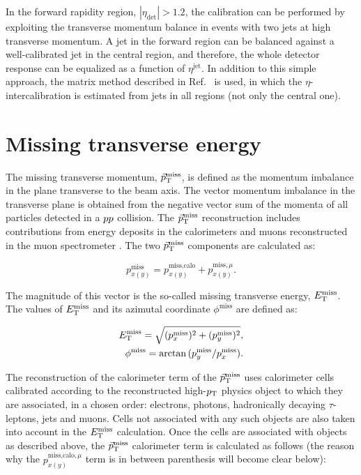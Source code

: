 In the forward rapidity region, $|\eta_\text{det}|>1.2$, the calibration can be performed by exploiting the transverse momentum balance in events with two jets at high transverse momentum. 
A jet in the forward region can be balanced against a well-calibrated jet in the central region, and therefore, the whole detector response can be equalized as a function of $\eta^{\text{jet}}$.
In addition to this simple approach, the matrix method described in Ref.~\cite{ATLAS:2011jea} is used, in which the $\eta$-intercalibration is estimated from jets in all regions (not only the central one).


\section{Missing transverse energy}
    \label{subsec:ETmissReco}

The missing transverse momentum, $\vec{p}_{\mathrm{T}}^{\mathrm{miss}}$, is defined as the momentum imbalance in the plane transverse to the beam axis.
The vector momentum imbalance in the transverse plane is obtained from the negative vector sum of the momenta of all particles detected in a $pp$ collision.
The $\vec{p}_{\mathrm{T}}^{\mathrm{miss}}$ reconstruction includes contributions from energy deposits in the calorimeters and muons reconstructed in the muon spectrometer \cite{TheATLAScollaboration:2013oia}.
The two $\vec{p}_{\mathrm{T}}^{\mathrm{miss}}$ components are calculated as:

\begin{equation}
p_{x(y)}^{\text{miss}} = p_{x(y)}^{\text{miss,calo}} + p_{x(y)}^{\text{miss},\mu}.
\label{eq:ETmissDef_All}
\end{equation}

The magnitude of this vector is the so-called missing transverse energy, $E_{\mathrm{T}}^{\mathrm{miss}}$.
The values of $E_{\mathrm{T}}^{\mathrm{miss}}$ and its azimutal coordinate $\phi^\text{miss}$ are defined as:

\begin{equation}
\begin{split}
\met = \sqrt{(p_{x}^{\text{miss}})^2 + (p_{y}^{\text{miss}})^2},\\
\phi^{\text{miss}} = \arctan{(p_{y}^{\text{miss}} / p_{x}^{\text{miss}})}.
\end{split}
\label{eq:ETmissDef_pol}
\end{equation}

The reconstruction of the calorimeter term of the $\vec{p}_{\mathrm{T}}^{\mathrm{miss}}$ uses calorimeter cells calibrated according to the reconstructed high-$p_{\mathrm{T}}$ physics object to which they are associated, in a chosen order: electrons, photons, hadronically decaying $\tau$-leptons, jets and muons.
Cells not associated with any such objects are also taken into account in the $E_{\mathrm{T}}^{\mathrm{miss}}$ calculation.
Once the cells are associated with objects as described above, the $\vec{p}_{\mathrm{T}}^{\mathrm{miss}}$ calorimeter term is calculated as follows \cite{Aad:1379858} (the reason why the $p_{x(y)}^{\text{miss,calo},\mu}$ term is in between parenthesis will become clear below):

